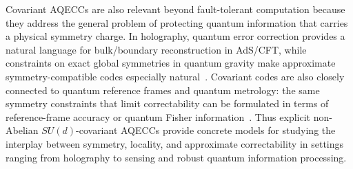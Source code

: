 \documentclass[10pt,twocolumn,superscriptaddress,aps,amsmath,amssymb,citeautoscript,floatfix,prx,longbibliography]{revtex4-2}
\theoremstyle{plain}
\theoremstyle{plain}
\theoremstyle{plain}
\theoremstyle{plain}
\theoremstyle{plain}
\theoremstyle{plain}
\begin{document}
Covariant AQECCs are also relevant beyond fault-tolerant computation because they address the general problem of protecting quantum information that carries a physical symmetry charge. In holography, quantum error correction provides a natural language for bulk/boundary reconstruction in AdS/CFT, while constraints on exact global symmetries in quantum gravity make approximate symmetry-compatible codes especially natural~\cite{Almheiri2015,Pastawski2015,HarlowOoguri2019}. Covariant codes are also closely connected to quantum reference frames and quantum metrology: the same symmetry constraints that limit correctability can be formulated in terms of reference-frame accuracy or quantum Fisher information~\cite{Hayden2021,Woods2020,Kubica2021}. Thus explicit non-Abelian \(SU(d)\)-covariant AQECCs provide concrete models for studying the interplay between symmetry, locality, and approximate correctability in settings ranging from holography to sensing and robust quantum information processing.
\end{document}
